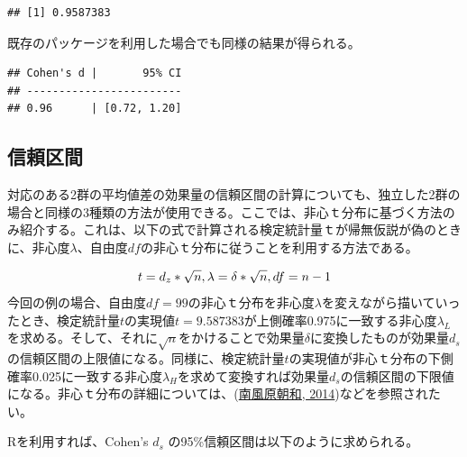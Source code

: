 \documentclass[
  ja=standard, xelatex, base=12pt]{bxjsreport}
\newenvironment{Shaded}{\begin{snugshade}}{\end{snugshade}}
\newcommand{\AttributeTok}[1]{\textcolor[rgb]{0.77,0.63,0.00}{#1}}
\newcommand{\CommentTok}[1]{\textcolor[rgb]{0.56,0.35,0.01}{\textit{#1}}}
\newcommand{\FunctionTok}[1]{\textcolor[rgb]{0.00,0.00,0.00}{#1}}
\newcommand{\NormalTok}[1]{#1}
\newcommand{\SpecialCharTok}[1]{\textcolor[rgb]{0.00,0.00,0.00}{#1}}
\begin{document}
\begin{verbatim}
## [1] 0.9587383
\end{verbatim}

既存のパッケージを利用した場合でも同様の結果が得られる。

\begin{Shaded}
\end{Shaded}

\begin{verbatim}
## Cohen's d |       95% CI
## ------------------------
## 0.96      | [0.72, 1.20]
\end{verbatim}

\hypertarget{ux4fe1ux983cux533aux9593-3}{%
\subsection{信頼区間}\label{ux4fe1ux983cux533aux9593-3}}

対応のある2群の平均値差の効果量の信頼区間の計算についても、独立した2群の場合と同様の3種類の方法が使用できる。ここでは、非心ｔ分布に基づく方法のみ紹介する。これは、以下の式で計算される検定統計量ｔが帰無仮説が偽のときに、非心度\(λ\)、自由度\(df\)の非心ｔ分布に従うことを利用する方法である。

\[
t=d_z*\sqrt{n},\\
\lambda=\delta*\sqrt{n},\\
df=n-1
\]
今回の例の場合、自由度\(df=99\)の非心ｔ分布を非心度\(λ\)を変えながら描いていったとき、検定統計量\(t\)の実現値\(t=9.587383\)が上側確率0.975に一致する非心度\(λ_L\)を求める。そして、それに\(\sqrt{n}\)をかけることで効果量\(\delta\)に変換したものが効果量\(d_s\)の信頼区間の上限値になる。同様に、検定統計量\(t\)の実現値が非心ｔ分布の下側確率0.025に一致する非心度\(λ_H\)を求めて変換すれば効果量\(d_s\)の信頼区間の下限値になる。非心ｔ分布の詳細については、(\protect\hyperlink{ref-haebara2014}{南風原朝和, 2014})などを参照されたい。

Rを利用すれば、Cohen's \(d_s\) の95\%信頼区間は以下のように求められる。
\end{document}
